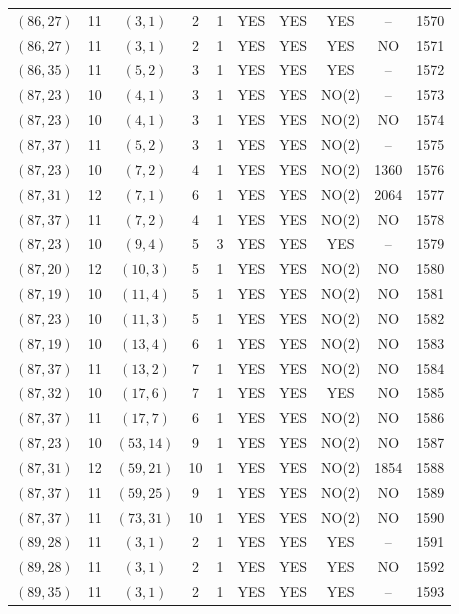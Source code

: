 \begin{longtable}{|c|c|c|c|c|c|c|c|c|c|}
$(86, 27)$ & 11 & $(3, 1)$ & 2 & 1 & YES & YES & YES & -- & 1570\\
$(86, 27)$ & 11 & $(3, 1)$ & 2 & 1 & YES & YES & YES & NO & 1571\\
$(86, 35)$ & 11 & $(5, 2)$ & 3 & 1 & YES & YES & YES & -- & 1572\\
$(87, 23)$ & 10 & $(4, 1)$ & 3 & 1 & YES & YES & NO(2) & -- & 1573\\
$(87, 23)$ & 10 & $(4, 1)$ & 3 & 1 & YES & YES & NO(2) & NO & 1574\\
$(87, 37)$ & 11 & $(5, 2)$ & 3 & 1 & YES & YES & NO(2) & -- & 1575\\
$(87, 23)$ & 10 & $(7, 2)$ & 4 & 1 & YES & YES & NO(2) & 1360 & 1576\\
$(87, 31)$ & 12 & $(7, 1)$ & 6 & 1 & YES & YES & NO(2) & 2064 & 1577\\
$(87, 37)$ & 11 & $(7, 2)$ & 4 & 1 & YES & YES & NO(2) & NO & 1578\\
$(87, 23)$ & 10 & $(9, 4)$ & 5 & 3 & YES & YES & YES & -- & 1579\\
$(87, 20)$ & 12 & $(10, 3)$ & 5 & 1 & YES & YES & NO(2) & NO & 1580\\
$(87, 19)$ & 10 & $(11, 4)$ & 5 & 1 & YES & YES & NO(2) & NO & 1581\\
$(87, 23)$ & 10 & $(11, 3)$ & 5 & 1 & YES & YES & NO(2) & NO & 1582\\
$(87, 19)$ & 10 & $(13, 4)$ & 6 & 1 & YES & YES & NO(2) & NO & 1583\\
$(87, 37)$ & 11 & $(13, 2)$ & 7 & 1 & YES & YES & NO(2) & NO & 1584\\
$(87, 32)$ & 10 & $(17, 6)$ & 7 & 1 & YES & YES & YES & NO & 1585\\
$(87, 37)$ & 11 & $(17, 7)$ & 6 & 1 & YES & YES & NO(2) & NO & 1586\\
$(87, 23)$ & 10 & $(53, 14)$ & 9 & 1 & YES & YES & NO(2) & NO & 1587\\
$(87, 31)$ & 12 & $(59, 21)$ & 10 & 1 & YES & YES & NO(2) & 1854 & 1588\\
$(87, 37)$ & 11 & $(59, 25)$ & 9 & 1 & YES & YES & NO(2) & NO & 1589\\
$(87, 37)$ & 11 & $(73, 31)$ & 10 & 1 & YES & YES & NO(2) & NO & 1590\\
$(89, 28)$ & 11 & $(3, 1)$ & 2 & 1 & YES & YES & YES & -- & 1591\\
$(89, 28)$ & 11 & $(3, 1)$ & 2 & 1 & YES & YES & YES & NO & 1592\\
$(89, 35)$ & 11 & $(3, 1)$ & 2 & 1 & YES & YES & YES & -- & 1593\\

\end{longtable}
